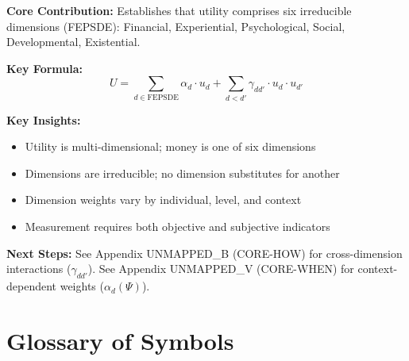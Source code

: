 \begin{tcolorbox}[colback=gray!5!white, colframe=gray!75!black,
    title=Appendix UNMAPPED_C Summary: CORE-WHAT]

\textbf{Core Contribution:}
Establishes that utility comprises six irreducible dimensions (FEPSDE):
Financial, Experiential, Psychological, Social, Developmental, Existential.

\textbf{Key Formula:}
\begin{equation}
U = \sum_{d \in \text{FEPSDE}} \alpha_d \cdot u_d + \sum_{d < d'} \gamma_{dd'} \cdot u_d \cdot u_{d'}
\end{equation}

\textbf{Key Insights:}
\begin{itemize}[nosep]
\item Utility is multi-dimensional; money is one of six dimensions
\item Dimensions are irreducible; no dimension substitutes for another
\item Dimension weights vary by individual, level, and context
\item Measurement requires both objective and subjective indicators
\end{itemize}

\textbf{Next Steps:}
See Appendix UNMAPPED_B (CORE-HOW) for cross-dimension interactions ($\gamma_{dd'}$).
See Appendix UNMAPPED_V (CORE-WHEN) for context-dependent weights ($\alpha_d(\Psi)$).

\end{tcolorbox}


\section{Glossary of Symbols}
\label{sec:what-glossary}

